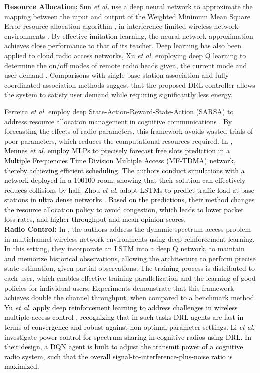 \documentclass[journal,comsoc,letter]{IEEEtran}
\newcommand{\rev}[1]{\textcolor{black}{#1}}
\begin{document}
\noindent\textbf{Resource Allocation:} Sun \emph{et al.} use a deep neural network to approximate the mapping between the input and output of the Weighted Minimum Mean Square Error resource allocation algorithm \cite{shi2011iteratively}, in interference-limited wireless network environments \cite{sun2017learning}. By effective imitation learning, the neural network approximation achieves close performance to that of its teacher. Deep learning has also been applied to cloud radio access networks, Xu \emph{et al.} employing deep Q learning to determine the on/off modes of remote radio heads given, the current mode and user demand \cite{xu2017deep3}. Comparisons with single base station association and fully coordinated association methods suggest that the proposed DRL controller allows the system to satisfy user demand while requiring significantly less energy. 

Ferreira \emph{et al.} employ deep State-Action-Reward-State-Action (SARSA) to address resource allocation management in cognitive communications \cite{ferreira2017multi}. By forecasting the effects of radio parameters, this framework avoids wasted trials of poor parameters, which reduces the computational resources required. \rev{In \cite{mennes2018neural}, Mennes \emph{et al.} employ MLPs to precisely forecast free slots prediction in a Multiple Frequencies Time Division Multiple Access (MF-TDMA) network, thereby achieving efficient scheduling. The authors conduct simulations with a network deployed in a 100100 room, showing that their solution can effectively reduces collisions by half. Zhou \emph{et al.} adopt LSTMs to predict traffic load at base stations in ultra dense networks \cite{8553651}. Based on the predictions, their method changes the resource allocation policy to avoid congestion, which leads to lower packet loss rates, and higher throughput and mean opinion scores.}\\
 
\noindent\textbf{Radio Control:} In \cite{naparstek2017deep}, the authors address the dynamic spectrum access problem in multichannel wireless network environments using deep reinforcement learning. In this setting, they incorporate an LSTM into a deep Q network, to maintain and memorize historical observations, allowing the architecture to perform precise state estimation, given partial observations. The training process is distributed to each user, which enables effective training parallelization and the learning of good policies for individual users. Experiments demonstrate that this framework achieves double the channel throughput, when compared to a benchmark method. \rev{Yu \emph{et al.} apply deep reinforcement learning to address challenges in wireless multiple access control \cite{yu2018deep2}, recognizing that in such tasks DRL agents are fast in terms of convergence and robust against non-optimal parameter settings. Li \emph{et al.} investigate power control for spectrum sharing in cognitive radios using DRL. In their design, a DQN agent is built to adjust the transmit power of a cognitive radio system, such that the overall signal-to-interference-plus-noise ratio is maximized.}
\end{document}
